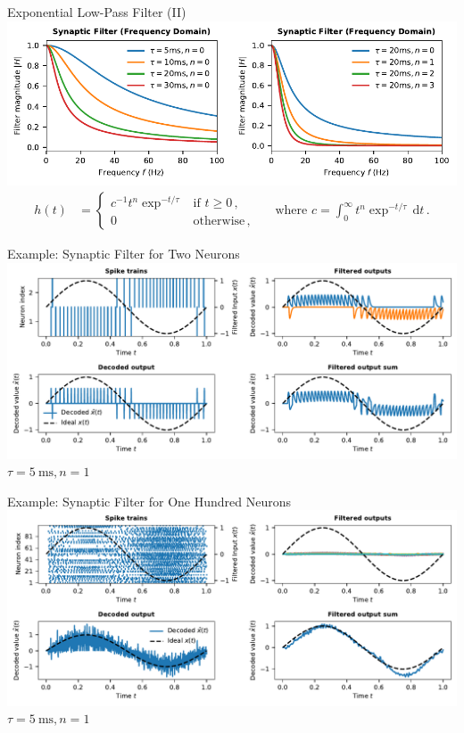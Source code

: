 \documentclass[handout,aspectratio=169]{beamer}
\begin{document}
\begin{frame}{Exponential Low-Pass Filter (II)}
	\includegraphics[width=\textwidth]{media/synaptic_filters_freq.pdf}
	\begin{align*}
	h(t) &= \begin{cases}
	c^{-1} t^n \exp^{-t / \tau} & \text{if } t \geq 0 \,,\\
	0 & \text{otherwise}\,,
	\end{cases}
	&& \text{where } c = \int_{0}^\infty t^n \exp^{-t / \tau} \,\mathrm{d}t \,.
	\end{align*}
\end{frame}

\begin{frame}{Example: Synaptic Filter for Two Neurons}
	\includegraphics[width=\textwidth]{media/two_neurons_synaptic_filter.pdf}\\
	\centering $\tau = \SI{5}{\milli\second}, n = 1$
\end{frame}

\begin{frame}{Example: Synaptic Filter for One Hundred Neurons}
	\includegraphics[width=\textwidth]{media/n_neurons_synaptic_filter.pdf}
	\centering $\tau = \SI{5}{\milli\second}, n = 1$
\end{frame}
\end{document}
